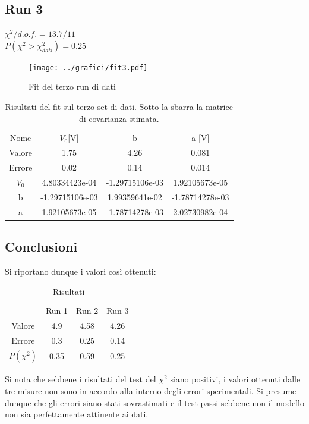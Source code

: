 \documentclass[a4paper,10pt]{article}
\begin{document}
\subsection{Run 3}

$\chi^2/d.o.f.= 13.7/11$ \\
$P(\chi^2>\chi^2_{dati})= 0.25$\\

\begin{figure}[H]
	\centering
	\texttt{[image: ../grafici/fit3.pdf]}
	\caption{Fit del terzo run di dati}
	\label{fig:RUN3}
\end{figure} 



\begin{table}[H]
	\centering
	\begin{tabular}{cccc}
	Nome	&	$ V_0 $[V] &  b      & a [V]\\
	Valore  &  1.75  & 4.26 & 0.081\\
	Errore	& 0.02 & 0.14 & 0.014\\ 
\hline 
	$V_0$ & 4.80334423e-04 & -1.29715106e-03  & 1.92105673e-05\\
 	b     & -1.29715106e-03 &  1.99359641e-02 & -1.78714278e-03\\
 	a     &  1.92105673e-05 & -1.78714278e-03 &  2.02730982e-04\\
\end{tabular}
\caption{Risultati del fit sul terzo set di dati. Sotto la sbarra la matrice di covarianza stimata.}
\label{tab:Run3}
\end{table}

\subsection{Conclusioni}

Si riportano dunque i valori così ottenuti:

\begin{table}[H]
	\centering
	\begin{tabular}{cccc}
    - & Run 1 & Run 2 & Run 3\\
Valore & 4.9 & 4.58 & 4.26\\
Errore & 0.3& 0.25 & 0.14\\
$P(\chi^2)$ & 0.35 & 0.59 & 0.25\\
\end{tabular}
\caption{Risultati}
\label{tab:Results}
\end{table}

Si nota che sebbene i risultati del test del $\chi^2$ siano positivi, i valori ottenuti dalle tre misure non sono in accordo alla interno degli errori sperimentali. Si presume dunque che gli errori siano stati sovrastimati e il test passi sebbene non il modello non sia perfettamente attinente ai dati. 
\end{document}

